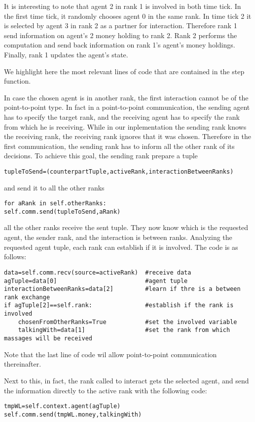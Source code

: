 \documentclass{article}
\begin{document}
It is interesting to note that agent 2 in rank 1 is involved in both time tick.
In the first time tick, it randomly chooses agent 0 in the same rank.
In time tick 2 it is selected by agent 3 in rank 2 as a partner for interaction. Therefore rank 1 send information on agent's 2 money holding to rank 2.
Rank 2 performs the computation and send back information on rank 1's agent's money holdings. Finally, rank 1 updates the agent's state.

We highlight here the most relevant lines of code that are contained in the step function.  

In case the chosen agent is in another rank, the first interaction cannot be of the point-to-point type. In fact in a point-to-point communication, the sending agent has to specify the target rank, and the receiving agent has to specify the rank from which he is receiving. While in our inplementation the sending rank knows the receiving rank, the receiving rank ignores that it was chosen. Therefore in the first communication, the sending rank has to inform all the other rank of its decisions. To achieve this goal, the sending rank prepare a tuple 
\begin{verbatim}
tupleToSend=(counterpartTuple,activeRank,interactionBetweenRanks)
\end{verbatim}
and send it to all the other ranks
\begin{verbatim}
for aRank in self.otherRanks:
self.comm.send(tupleToSend,aRank)
\end{verbatim}
all the other ranks receive the sent tuple. They now know which is the requested agent, the sender rank, and the interaction is between ranks.
Analyzing the requested agent tuple, each rank can establish if it is involved. The code is as follows:
\begin{verbatim}
data=self.comm.recv(source=activeRank)  #receive data
agTuple=data[0]                         #agent tuple
interactionBetweenRanks=data[2]         #learn if thre is a between rank exchange
if agTuple[2]==self.rank:               #establish if the rank is involved
    chosenFromOtherRanks=True           #set the involved variable
    talkingWith=data[1]                 #set the rank from which massages will be received
\end{verbatim}
Note that the last line of code wil allow point-to-point communication thereinafter.

Next to this, in fact, the rank called to interact gets the selected agent, and send the information directly to the active rank with the following code:
\begin{verbatim}
tmpWL=self.context.agent(agTuple)
self.comm.send(tmpWL.money,talkingWith)
\end{verbatim}             
\end{document}
